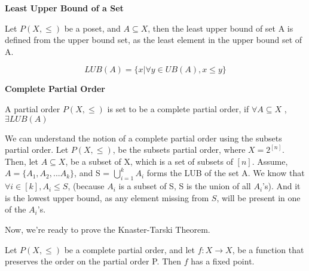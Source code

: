 \textbf{Least Upper Bound of a Set}

Let $P(X,\le)$ be a poset, and $A \subseteq X$, then the least upper bound of set A is defined from the upper bound set, as the least element in the upper bound set of A.

$$ LUB(A) = \{x  | \forall y \in UB(A), x \le y\} $$

\textbf{Complete Partial Order}

A partial order $P(X,\le)$ is set to be a complete partial order, if $\forall A \subseteq X$ , $\exists LUB(A)$

\medskip


We can understand the notion of a complete partial order using the subsets partial order. Let $P(X,\le)$, be the subsets partial order, where $X = 2^{[n]}$. Then, let $A \subseteq X$, be a subset of X, which is a set of subsets of $[n]$. Assume, $A = \{A_1,A_2,...A_k\}$, and S =  $\bigcup_{i=1}^{k} A_{i}$ forms the LUB of the set A. We know that $\forall i \in [k], A_i \le S$, (because $A_i$ is a subset of S, S is the union of all $A_i$'s). And it is the lowest upper bound, as any element missing from $S$, will be present in one of the $A_i$'s.

Now, we're ready to prove the Knaster-Tarski Theorem.

\begin{theorem}
Let $P(X,\le)$ be a complete partial order, and let $f: X \to X$, be a function that preserves the order on the partial order P. Then $f$ has a fixed point.
\end{theorem}

